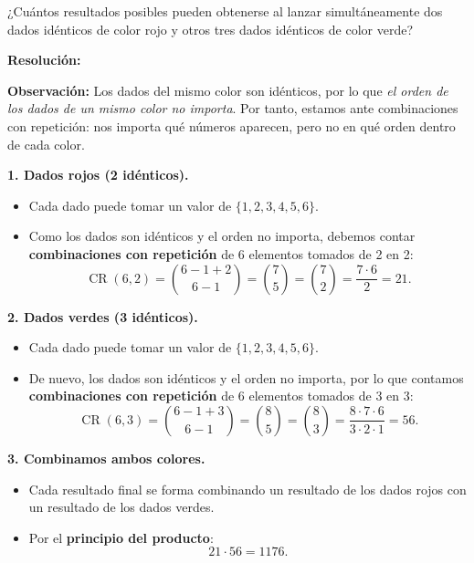 \documentclass[a4paper,12pt]{article}
\begin{document}
\begin{ejercicio}[title=Ejercicio 27]
¿Cuántos resultados posibles pueden obtenerse al lanzar simultáneamente dos dados idénticos de color rojo y otros tres dados idénticos de color verde?

\tcblower
\textbf{Resolución:}

\medskip
\textbf{Observación:}  
Los dados del mismo color son idénticos, por lo que \emph{el orden de los dados de un mismo color no importa}.  
Por tanto, estamos ante combinaciones con repetición: nos importa qué números aparecen, pero no en qué orden dentro de cada color.

\medskip
\textbf{1. Dados rojos (2 idénticos).}  

\begin{itemize}
\item Cada dado puede tomar un valor de $\{1,2,3,4,5,6\}$.  
\item Como los dados son idénticos y el orden no importa, debemos contar \textbf{combinaciones con repetición} de 6 elementos tomados de 2 en 2:  
\[
\operatorname{CR}(6,2) = \binom{6-1+2}{6-1} = \binom{7}{5} = \binom{7}{2} = \frac{7\cdot6}{2} = 21.
\]
\end{itemize}

\medskip
\textbf{2. Dados verdes (3 idénticos).}  

\begin{itemize}
\item Cada dado puede tomar un valor de $\{1,2,3,4,5,6\}$.  
\item De nuevo, los dados son idénticos y el orden no importa, por lo que contamos \textbf{combinaciones con repetición} de 6 elementos tomados de 3 en 3:  
\[
\operatorname{CR}(6,3) = \binom{6-1+3}{6-1} = \binom{8}{5} = \binom{8}{3} = \frac{8\cdot7\cdot6}{3\cdot2\cdot1} = 56.
\]
\end{itemize}

\medskip
\textbf{3. Combinamos ambos colores.}  

\begin{itemize}
\item Cada resultado final se forma combinando un resultado de los dados rojos con un resultado de los dados verdes.  
\item Por el \textbf{principio del producto}:
\[
21 \cdot 56 = \boxed{1176}.
\]
\end{itemize}

\end{ejercicio}
\end{document}
